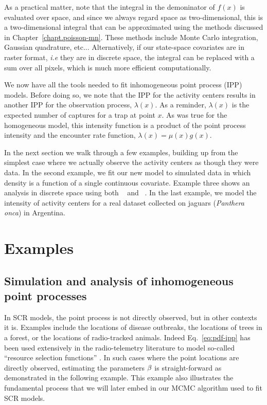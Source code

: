 As a practical matter, note that the integral in the
demoninator of $f(x)$ is evaluated over space, and since we always regard
space as two-dimensional, this is a two-dimensional integral that can
be approximated using the methods discussed in
Chapter~\ref{chapt.poisson-mn}. These methods include
Monte Carlo integration, Gaussian quadrature, etc... Alternatively, if
our state-space covariates are in raster format, \emph{i.e} they are
in discrete space, the integral can be replaced with a sum over
all pixels, which is much more efficient computationally.

We now have all the tools needed to fit inhomogeneous point process
(IPP) models. Before doing so, we note that the IPP for the activity centers
results in another IPP for the observation process, $\lambda(x)$. As
a reminder, $\lambda(x)$ is the expected number of captures for a trap
at point $x$. As was true for the homogeneous model, this
intensity function is a product of the point process intensity
and the encounter rate function, $\lambda(x) = \mu(x) g(x)$.

In the next section we walk through a few examples, building up from
the simplest case where we actually observe the activity centers as
though they were data. In the second example, we fit our new model to simulated
data in which density is a function of a single continuous
covariate. Example three shows an analysis in discrete space using
both \secr~\citep{efford:2011} and \jags~\citep{plummer:2003}. In the
last example, we model the intensity of
activity centers for a real dataset collected on jaguars
(\emph{Panthera onca}) in Argentina.

\section{Examples}

\subsection{Simulation and analysis of inhomogeneous point processes}

In SCR models, the point process is not directly observed, but in
other contexts it is. Examples include the locations of disease
outbreaks, the locations of trees in a forest, or the locations of
radio-tracked animals. Indeed Eq.~\ref{eq:pdf-ipp} has been used
extensively in the radio-telemetry literature to model so-called
``resource selection functions'' \citep{manly:2002,lele_keim:2006}.
In such cases where the point locations are directly observed,
estimating the parameters $\bf \beta$ is straight-forward as
demonstrated in the following example. This example also illustrates
the fundamental process that we will later embed in our MCMC algorithm
used to fit SCR models.


